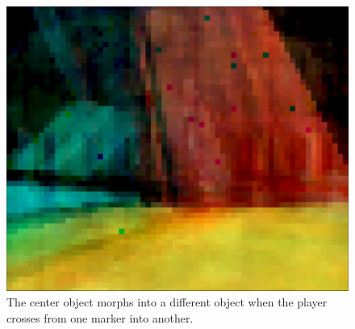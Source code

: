 \begin{figure}[p]
  \includegraphics[width=0.36\textheight]{images/workflow/object_morphing/Morph4.png}
  \caption{The center object morphs into a different object when the player crosses from one marker into another.}
  \label{MorphingToOther}
\end{figure}
